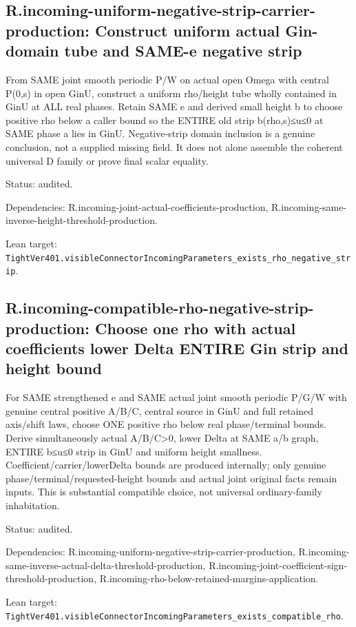 \documentclass{article}
\begin{document}
\subsection*{R.incoming-uniform-negative-strip-carrier-production: Construct uniform actual Gin-domain tube and SAME-e negative strip}
From SAME joint smooth periodic P/W on actual open Omega with central P(0,s) in open GinU, construct a uniform rho/height tube wholly contained in GinU at ALL real phases. Retain SAME e and derived small height b to choose positive rho below a caller bound so the ENTIRE old strip b(rho,s)≤u≤0 at SAME phase a lies in GinU. Negative-strip domain inclusion is a genuine conclusion, not a supplied missing field. It does not alone assemble the coherent universal D family or prove final scalar equality.
\par Status: audited.
\par Dependencies: R.incoming-joint-actual-coefficients-production, R.incoming-same-inverse-height-threshold-production.
\par Lean target: \texttt{TightVer401.visibleConnectorIncomingParameters\_exists\_rho\_negative\_strip}.
\subsection*{R.incoming-compatible-rho-negative-strip-production: Choose one rho with actual coefficients lower Delta ENTIRE Gin strip and height bound}
For SAME strengthened e and SAME actual joint smooth periodic P/G/W with genuine central positive A/B/C, central source in GinU and full retained axis/shift laws, choose ONE positive rho below real phase/terminal bounds. Derive simultaneously actual A/B/C>0, lower Delta at SAME a/b graph, ENTIRE b≤u≤0 strip in GinU and uniform height smallness. Coefficient/carrier/lowerDelta bounds are produced internally; only genuine phase/terminal/requested-height bounds and actual joint original facts remain inputs. This is substantial compatible choice, not universal ordinary-family inhabitation.
\par Status: audited.
\par Dependencies: R.incoming-uniform-negative-strip-carrier-production, R.incoming-same-inverse-actual-delta-threshold-production, R.incoming-joint-coefficient-sign-threshold-production, R.incoming-rho-below-retained-margins-application.
\par Lean target: \texttt{TightVer401.visibleConnectorIncomingParameters\_exists\_compatible\_rho}.
\end{document}
